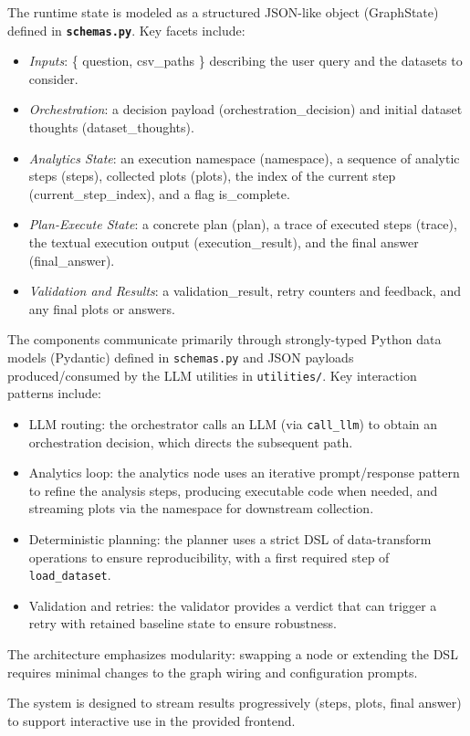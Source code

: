 The runtime state is modeled as a structured JSON-like object (GraphState) defined in
\textbf{\texttt{schemas.py}}. Key facets include:
\begin{itemize}
  \item \emph{Inputs}: \{ question, csv\_paths \} describing the user query and the
    datasets to consider.
  \item \emph{Orchestration}: a decision payload (orchestration\_decision) and initial dataset
    thoughts (dataset\_thoughts).
  \item \emph{Analytics State}: an execution namespace (namespace), a sequence of analytic steps
    (steps), collected plots (plots), the index of the current step (current\_step\_index), and a flag
    is\_complete.
  \item \emph{Plan-Execute State}: a concrete plan (plan), a trace of executed steps (trace),
    the textual execution output (execution\_result), and the final answer (final\_answer).
  \item \emph{Validation and Results}: a validation\_result, retry counters and feedback, and
    any final plots or answers.
\end{itemize}

The components communicate primarily through strongly-typed Python data models (Pydantic)
defined in \texttt{\texttt{schemas.py}} and JSON payloads produced/consumed by the LLM utilities
in \texttt{utilities/}. Key interaction patterns include:
\begin{itemize}
  \item LLM routing: the orchestrator calls an LLM (via \texttt{call\_llm}) to obtain an
    orchestration decision, which directs the subsequent path.
  \item Analytics loop: the analytics node uses an iterative prompt/response pattern to refine
    the analysis steps, producing executable code when needed, and streaming plots via the
    namespace for downstream collection.
  \item Deterministic planning: the planner uses a strict DSL of data-transform operations to
    ensure reproducibility, with a first required step of \texttt{load\_dataset}.
  \item Validation and retries: the validator provides a verdict that can trigger a retry with
    retained baseline state to ensure robustness.
\end{itemize}


The architecture emphasizes modularity: swapping a node or extending the DSL requires minimal changes to the graph wiring and configuration prompts.

The system is designed to stream results progressively (steps, plots, final answer) to support interactive use in the provided frontend.
